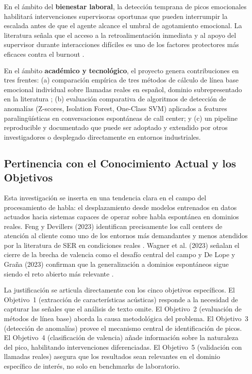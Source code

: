En el ámbito del \textbf{bienestar laboral}, la detección temprana de picos
emocionales habilitará intervenciones supervisoras oportunas que pueden interrumpir la
escalada antes de que el agente alcance el umbral de agotamiento emocional. La
literatura señala que el acceso a la retroalimentación inmediata y al apoyo del
supervisor durante interacciones difíciles es uno de los factores protectores más
eficaces contra el burnout \cite{sqm2023}.

En el ámbito \textbf{académico y tecnológico}, el proyecto genera contribuciones en
tres frentes: (a) comparación empírica de tres métodos de cálculo de línea base
emocional individual sobre llamadas reales en español, dominio subrepresentado en la
literatura \cite{jha2022, delope2023}; (b) evaluación comparativa de algoritmos de
detección de anomalías (Z-scores, Isolation Forest, One-Class SVM) aplicados a
features paralingüísticas en conversaciones espontáneas de call center; y (c) un
pipeline reproducible y documentado que puede ser adoptado y extendido por otros
investigadores o desplegado directamente en entornos industriales.

\subsection{Pertinencia con el Conocimiento Actual y los Objetivos}

Esta investigación se inserta en una tendencia clara en el campo del procesamiento de
habla: el desplazamiento desde modelos entrenados en datos actuados hacia sistemas
capaces de operar sobre habla espontánea en dominios reales. Feng y Devillers (2023)
identifican precisamente los call centers de atención al cliente como uno de los
entornos más demandantes y menos atendidos por la literatura de SER en condiciones
reales \cite{feng2023}. Wagner et al. (2023) señalan el cierre de la brecha de
valencia como el desafío central del campo \cite{wagner2023} y De Lope y Graña (2023)
confirman que la generalización a dominios espontáneos sigue siendo el reto abierto
más relevante \cite{delope2023}.

La justificación se articula directamente con los cinco objetivos específicos. El
Objetivo~1 (extracción de características acústicas) responde a la necesidad de
capturar las señales que el análisis de texto omite. El Objetivo~2 (evaluación de
métodos de línea base) aborda la causa metodológica del problema. El Objetivo~3
(detección de anomalías) provee el mecanismo central de identificación de picos. El
Objetivo~4 (clasificación de valencia) añade información sobre la naturaleza del
pico, habilitando intervenciones diferenciadas. El Objetivo~5 (validación con llamadas
reales) asegura que los resultados sean relevantes en el dominio específico de interés,
no solo en benchmarks de laboratorio.
